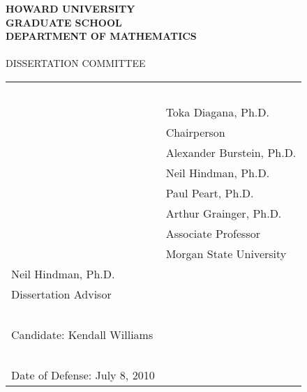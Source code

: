 \documentclass[12pt]{report}
\theoremstyle{definition}
\begin{document}
\thispagestyle{plain}




\begin{center}

{\bf HOWARD UNIVERSITY\\GRADUATE SCHOOL\\DEPARTMENT OF MATHEMATICS}\\\ \\DISSERTATION COMMITTEE

\end{center}

\vspace{.5in}

\begin{tabular}{@{}l @{}l}

\hspace{2.5in} & \hspace{2.5in}\ \\ \cline{2-2}

\hspace{2.5in} & Toka Diagana, Ph.D.\\

\hspace{2.5in} & Chairperson\\[.55in] \cline{2-2}

\hspace{2.5in} & Alexander Burstein, Ph.D.\\[.55in]\cline{2-2}

\hspace{2.5in} & Neil Hindman, Ph.D.\\[.55in]\cline{2-2}

\hspace{2.5in} & Paul Peart, Ph.D.\\[.55in]\cline{2-2}

\hspace{2.5in} & Arthur Grainger, Ph.D.\\

\hspace{2.5in} & Associate Professor\\

\hspace{2.5in} & Morgan State University\\[.55in] \cline{1-1}



Neil Hindman, Ph.D.\\

Dissertation Advisor\\

\ \\

Candidate:  Kendall Williams\\

\ \\

Date of Defense:  July 8, 2010

\end{tabular}
\end{document}
